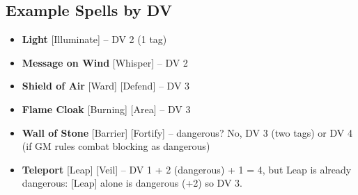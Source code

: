 \subsection{Example Spells by DV}
\begin{itemize}
    \item \textbf{Light} [Illuminate] -- DV 2 (1 tag)
    \item \textbf{Message on Wind} [Whisper] -- DV 2
    \item \textbf{Shield of Air} [Ward] [Defend] -- DV 3
    \item \textbf{Flame Cloak} [Burning] [Area] -- DV 3
    \item \textbf{Wall of Stone} [Barrier] [Fortify] -- dangerous? No, DV 3 (two tags) or DV 4 (if GM rules combat blocking as dangerous)
    \item \textbf{Teleport} [Leap] [Veil] -- DV 1 + 2 (dangerous) + 1 = 4, but Leap is already dangerous: [Leap] alone is dangerous (+2) so DV 3.
\end{itemize}

%
%
%
%
%

